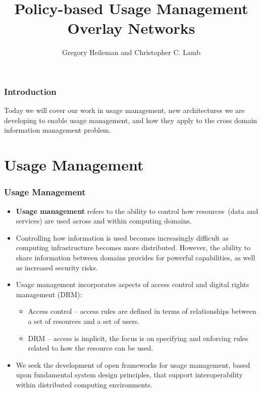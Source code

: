 \documentclass[t,handout, 10pt]{beamer}
\title{Policy-based Usage Management Overlay Networks}
\author [Greg, Chris]{Gregory Heileman and Christopher C. Lamb}
\institute[University of New Mexico]{
\inst {}Department of Electrical and Computer Engineering\\
University of New Mexico}
\date{}
\begin{document}
\begin{frame}
\titlepage
\end{frame}


\begin{frame}
\frametitle{Introduction}
Today we will cover our work in usage management, new architectures we are developing to enable usage management, and how they apply to the cross domain information management problem.
\tableofcontents 
\end{frame}

\section{Usage Management}

\begin{frame}\frametitle{Usage Management}
\begin{itemize}
 \item \textbf{Usage management} refers to the ability to control how resources~(data and services) are used across and within computing domains.
 \pause
 \item Controlling how information is used becomes increasingly difficult as computing infrastructure becomes more distributed.  \pause However, the ability to share information between domains provides for powerful capabilities, as well as increased security risks.
 \pause
 \item Usage management incorporates aspects of access control and digital rights management (DRM):
 \pause
  \begin{itemize}
   \item Access control -- access rules are defined in terms of relationships between a set of resources and a set of users.
  \pause
  \item DRM -- access is implicit, the focus is on specifying and enforcing rules related to how the resource can be used.
  \end{itemize}
  \item We seek the development of open frameworks for usage management, based upon fundamental system design principles, that support interoperability within distributed computing environments. 
\end{itemize}
\end{frame}
\end{document}
